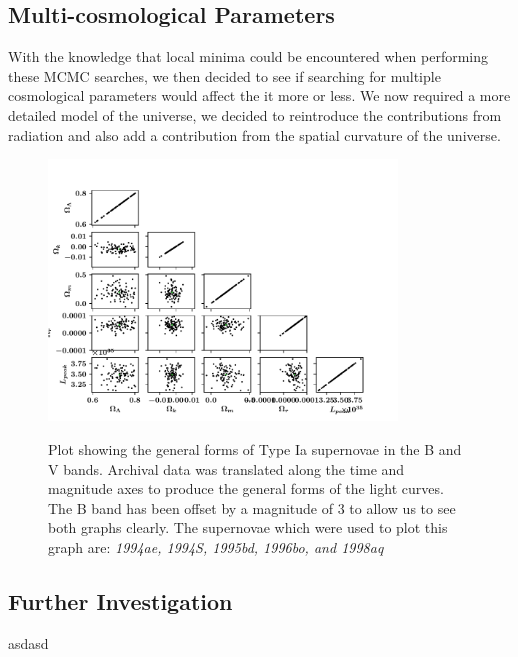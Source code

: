 \documentclass[twocolumn]{revtex4}
\begin{document}
{\vspace{-3ex}
\subsection{Multi-cosmological Parameters} 
\vspace{-2ex}
With the knowledge that local minima could be encountered when performing these MCMC searches, we then decided to see if searching for multiple cosmological parameters would affect the it more or less. We now required a more detailed model of the universe, we decided to reintroduce the contributions from radiation and also add a contribution from the spatial curvature of the universe. 

\begin{figure}[!h]
\begin{center}
\includegraphics[width=9.25cm]{results/triangle}
\caption[]{Plot showing the general forms of Type Ia supernovae in the B and V bands. Archival data was translated along the time and magnitude axes to produce the general forms of the light curves. The B band has been offset by a magnitude of $3$ to allow us to see both graphs clearly. The supernovae which were used to plot this graph are: \em{1994ae, 1994S, 1995bd, 1996bo, }\em  and \em{1998aq }\em  }
\vspace{-3ex}
\label{fig:triangle}
\end{center}
\end{figure}

\vspace{-3ex}
\subsection{Further Investigation} 
\vspace{-2ex}

asdasd

\vspace{-5ex}
}
\end{document}
